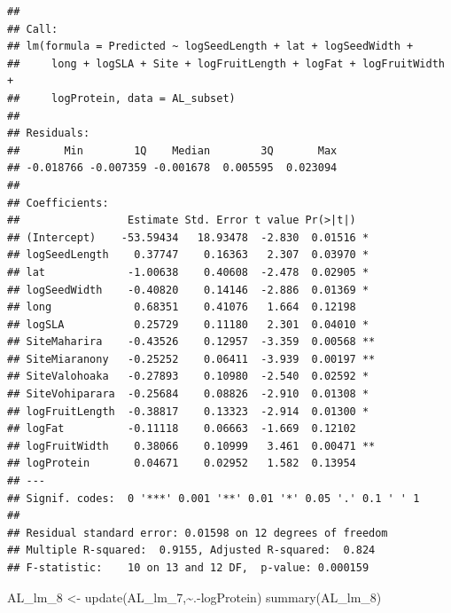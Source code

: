 \documentclass[
  12pt,
]{article}
\newenvironment{Shaded}{\begin{snugshade}}{\end{snugshade}}
\newcommand{\FunctionTok}[1]{\textcolor[rgb]{0.00,0.00,0.00}{#1}}
\newcommand{\NormalTok}[1]{#1}
\newcommand{\OtherTok}[1]{\textcolor[rgb]{0.56,0.35,0.01}{#1}}
\newcommand{\SpecialCharTok}[1]{\textcolor[rgb]{0.00,0.00,0.00}{#1}}
\begin{document}
\begin{verbatim}
## 
## Call:
## lm(formula = Predicted ~ logSeedLength + lat + logSeedWidth + 
##     long + logSLA + Site + logFruitLength + logFat + logFruitWidth + 
##     logProtein, data = AL_subset)
## 
## Residuals:
##       Min        1Q    Median        3Q       Max 
## -0.018766 -0.007359 -0.001678  0.005595  0.023094 
## 
## Coefficients:
##                 Estimate Std. Error t value Pr(>|t|)   
## (Intercept)    -53.59434   18.93478  -2.830  0.01516 * 
## logSeedLength    0.37747    0.16363   2.307  0.03970 * 
## lat             -1.00638    0.40608  -2.478  0.02905 * 
## logSeedWidth    -0.40820    0.14146  -2.886  0.01369 * 
## long             0.68351    0.41076   1.664  0.12198   
## logSLA           0.25729    0.11180   2.301  0.04010 * 
## SiteMaharira    -0.43526    0.12957  -3.359  0.00568 **
## SiteMiaranony   -0.25252    0.06411  -3.939  0.00197 **
## SiteValohoaka   -0.27893    0.10980  -2.540  0.02592 * 
## SiteVohiparara  -0.25684    0.08826  -2.910  0.01308 * 
## logFruitLength  -0.38817    0.13323  -2.914  0.01300 * 
## logFat          -0.11118    0.06663  -1.669  0.12102   
## logFruitWidth    0.38066    0.10999   3.461  0.00471 **
## logProtein       0.04671    0.02952   1.582  0.13954   
## ---
## Signif. codes:  0 '***' 0.001 '**' 0.01 '*' 0.05 '.' 0.1 ' ' 1
## 
## Residual standard error: 0.01598 on 12 degrees of freedom
## Multiple R-squared:  0.9155, Adjusted R-squared:  0.824 
## F-statistic:    10 on 13 and 12 DF,  p-value: 0.000159
\end{verbatim}

\begin{Shaded}
\begin{Highlighting}[]
\NormalTok{AL\_lm\_8 }\OtherTok{\textless{}{-}} \FunctionTok{update}\NormalTok{(AL\_lm\_7,}\SpecialCharTok{\textasciitilde{}}\NormalTok{.}\SpecialCharTok{{-}}\NormalTok{logProtein)}
\FunctionTok{summary}\NormalTok{(AL\_lm\_8)}
\end{Highlighting}
\end{Shaded}
\end{document}
